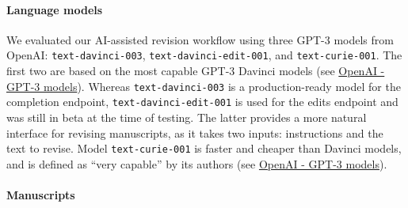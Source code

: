 \documentclass[
]{article}
\begin{document}
\hypertarget{language-models}{%
\paragraph{Language models}\label{language-models}}

We evaluated our AI-assisted revision workflow using three GPT-3 models from OpenAI: \texttt{text-davinci-003}, \texttt{text-davinci-edit-001}, and \texttt{text-curie-001}.
The first two are based on the most capable GPT-3 Davinci models (see \href{https://platform.openai.com/docs/models/gpt-3}{OpenAI - GPT-3 models}).
Whereas \texttt{text-davinci-003} is a production-ready model for the completion endpoint, \texttt{text-davinci-edit-001} is used for the edits endpoint and was still in beta at the time of testing.
The latter provides a more natural interface for revising manuscripts, as it takes two inputs: instructions and the text to revise.
Model \texttt{text-curie-001} is faster and cheaper than Davinci models, and is defined as ``very capable'' by its authors (see \href{https://platform.openai.com/docs/models/gpt-3}{OpenAI - GPT-3 models}).

\hypertarget{manuscripts}{%
\paragraph{Manuscripts}\label{manuscripts}}
\end{document}
